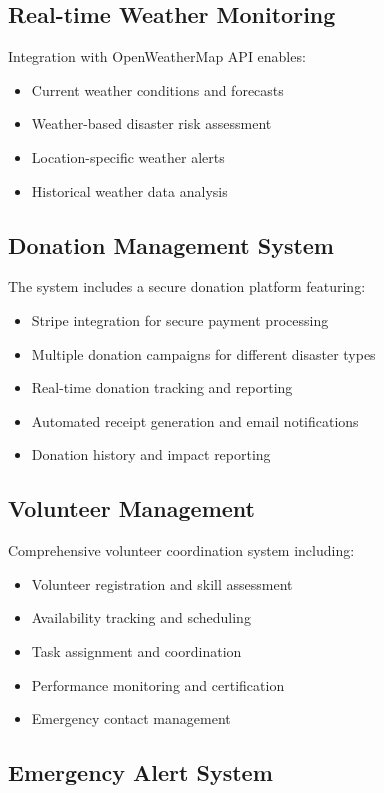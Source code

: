 \documentclass[12pt,a4paper]{article}
\begin{document}
\subsection{Real-time Weather Monitoring}

Integration with OpenWeatherMap API enables:
\begin{itemize}
    \item Current weather conditions and forecasts
    \item Weather-based disaster risk assessment
    \item Location-specific weather alerts
    \item Historical weather data analysis
\end{itemize}

\subsection{Donation Management System}

The system includes a secure donation platform featuring:
\begin{itemize}
    \item Stripe integration for secure payment processing
    \item Multiple donation campaigns for different disaster types
    \item Real-time donation tracking and reporting
    \item Automated receipt generation and email notifications
    \item Donation history and impact reporting
\end{itemize}

\subsection{Volunteer Management}

Comprehensive volunteer coordination system including:
\begin{itemize}
    \item Volunteer registration and skill assessment
    \item Availability tracking and scheduling
    \item Task assignment and coordination
    \item Performance monitoring and certification
    \item Emergency contact management
\end{itemize}

\subsection{Emergency Alert System}
\end{document}

